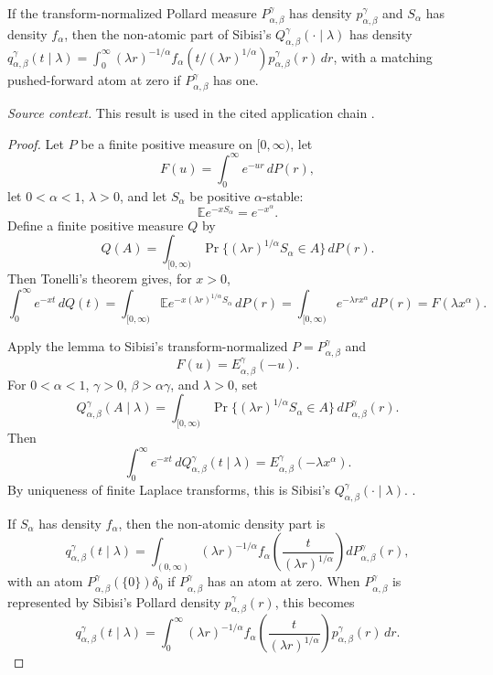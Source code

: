 \begin{proposition}
\label{res:prabhakar-q-density-mixture-formula}
If the transform-normalized Pollard measure \(P^\gamma_{\alpha,\beta}\) has density \(p^\gamma_{\alpha,\beta}\) and \(S_\alpha\) has density \(f_\alpha\), then the non-atomic part of Sibisi's \(Q^\gamma_{\alpha,\beta}(\cdot\mid\lambda)\) has density \(q^\gamma_{\alpha,\beta}(t\mid\lambda)=\int_0^\infty (\lambda r)^{-1/\alpha}f_\alpha(t/(\lambda r)^{1/\alpha})p^\gamma_{\alpha,\beta}(r)\,dr\), with a matching pushed-forward atom at zero if \(P^\gamma_{\alpha,\beta}\) has one.

\emph{Source context.} This result is used in the cited application chain \cite{sibisi-prabhakar}.
\end{proposition}
\begin{proof}
Let \(P\) be a finite positive measure on \([0,\infty)\), let
\[
F(u)=\int_0^\infty e^{-ur}\,dP(r),
\]
let \(0<\alpha<1\), \(\lambda>0\), and let \(S_\alpha\) be positive \(\alpha\)-stable:
\[
\mathbb E e^{-xS_\alpha}=e^{-x^\alpha}.
\]
Define a finite positive measure \(Q\) by
\[
Q(A)=\int_{[0,\infty)}
\Pr\{(\lambda r)^{1/\alpha}S_\alpha\in A\}\,dP(r).
\]
Then Tonelli's theorem gives, for \(x>0\),
\[
\int_0^\infty e^{-xt}\,dQ(t)
=\int_{[0,\infty)}
\mathbb E e^{-x(\lambda r)^{1/\alpha}S_\alpha}\,dP(r)
=\int_{[0,\infty)}e^{-\lambda r x^\alpha}\,dP(r)
=F(\lambda x^\alpha).
\]

Apply the lemma to Sibisi's transform-normalized \(P=P^\gamma_{\alpha,\beta}\) and
\[
F(u)=E^\gamma_{\alpha,\beta}(-u).
\]
For \(0<\alpha<1\), \(\gamma>0\), \(\beta>\alpha\gamma\), and \(\lambda>0\), set
\[
Q^\gamma_{\alpha,\beta}(A\mid\lambda)
=\int_{[0,\infty)}
\Pr\{(\lambda r)^{1/\alpha}S_\alpha\in A\}\,
dP^\gamma_{\alpha,\beta}(r).
\]
Then
\[
\int_0^\infty e^{-xt}\,dQ^\gamma_{\alpha,\beta}(t\mid\lambda)
=E^\gamma_{\alpha,\beta}(-\lambda x^\alpha).
\]
By uniqueness of finite Laplace transforms, this is Sibisi's \(Q^\gamma_{\alpha,\beta}(\cdot\mid\lambda)\). \cite{sibisi-prabhakar}.

If \(S_\alpha\) has density \(f_\alpha\), then the non-atomic density part is
\[
q^\gamma_{\alpha,\beta}(t\mid\lambda)
=\int_{(0,\infty)}
(\lambda r)^{-1/\alpha}
f_\alpha\!\left(\frac{t}{(\lambda r)^{1/\alpha}}\right)
dP^\gamma_{\alpha,\beta}(r),
\]
with an atom \(P^\gamma_{\alpha,\beta}(\{0\})\delta_0\) if \(P^\gamma_{\alpha,\beta}\) has an atom at zero. When \(P^\gamma_{\alpha,\beta}\) is represented by Sibisi's Pollard density \(p^\gamma_{\alpha,\beta}(r)\), this becomes
\[
q^\gamma_{\alpha,\beta}(t\mid\lambda)
=\int_0^\infty
(\lambda r)^{-1/\alpha}
f_\alpha\!\left(\frac{t}{(\lambda r)^{1/\alpha}}\right)
p^\gamma_{\alpha,\beta}(r)\,dr.
\]


\end{proof}
